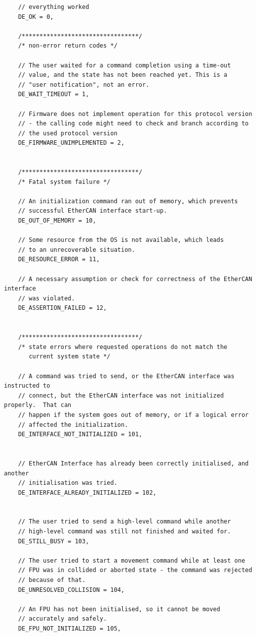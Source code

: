 \documentclass[fontsize=12,a4paper]{scrreprt}
\begin{document}
\begin{verbatim}
    // everything worked
    DE_OK = 0,

    /*********************************/
    /* non-error return codes */

    // The user waited for a command completion using a time-out
    // value, and the state has not been reached yet. This is a
    // "user notification", not an error.
    DE_WAIT_TIMEOUT = 1,

    // Firmware does not implement operation for this protocol version
    // - the calling code might need to check and branch according to
    // the used protocol version
    DE_FIRMWARE_UNIMPLEMENTED = 2,


    /*********************************/
    /* Fatal system failure */

    // An initialization command ran out of memory, which prevents
    // successful EtherCAN interface start-up.
    DE_OUT_OF_MEMORY = 10,

    // Some resource from the OS is not available, which leads
    // to an unrecoverable situation.
    DE_RESOURCE_ERROR = 11,

    // A necessary assumption or check for correctness of the EtherCAN interface
    // was violated.
    DE_ASSERTION_FAILED = 12,


    /*********************************/
    /* state errors where requested operations do not match the
       current system state */

    // A command was tried to send, or the EtherCAN interface was instructed to
    // connect, but the EtherCAN interface was not initialized properly.  That can
    // happen if the system goes out of memory, or if a logical error
    // affected the initialization.
    DE_INTERFACE_NOT_INITIALIZED = 101,


    // EtherCAN Interface has already been correctly initialised, and another
    // initialisation was tried.
    DE_INTERFACE_ALREADY_INITIALIZED = 102,


    // The user tried to send a high-level command while another
    // high-level command was still not finished and waited for.
    DE_STILL_BUSY = 103,

    // The user tried to start a movement command while at least one
    // FPU was in collided or aborted state - the command was rejected
    // because of that.
    DE_UNRESOLVED_COLLISION = 104,

    // An FPU has not been initialised, so it cannot be moved
    // accurately and safely.
    DE_FPU_NOT_INITIALIZED = 105,


\end{verbatim}
\end{document}
